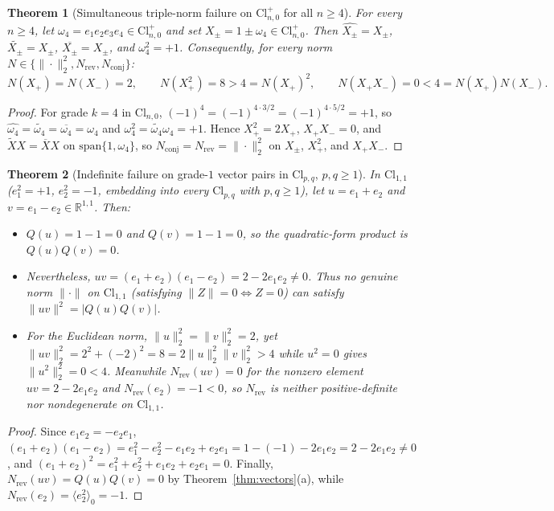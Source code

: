 \documentclass[11pt]{article}
\newtheorem{theorem}{Theorem}[section]
\theoremstyle{definition}
\newcommand{\Cl}{\mathrm{Cl}}
\newcommand{\R}{\mathbb{R}}
\newcommand{\Nrev}{N_{\mathrm{rev}}}
\newcommand{\Nconj}{N_{\mathrm{conj}}}
\begin{document}
\begin{theorem}[Simultaneous triple-norm failure on $\Cl_{n,0}^+$ for all $n\ge 4$]\label{thm:ref-even4}
For every $n\ge 4$, let $\omega_4=e_1e_2e_3e_4\in\Cl_{n,0}^+$ and set $X_\pm=1\pm\omega_4\in\Cl_{n,0}^+$. Then $\widehat{X_\pm}=X_\pm$, $\widetilde{X_\pm}=X_\pm$, $\overline{X_\pm}=X_\pm$, and $\omega_4^2=+1$. Consequently, for every norm $N\in\{\|\cdot\|_2^2,\Nrev,\Nconj\}$:
\[
  N(X_+)=N(X_-)=2, \qquad N(X_+^2)=8 > 4 = N(X_+)^2, \qquad N(X_+X_-)=0 < 4 = N(X_+)N(X_-).
\]
\end{theorem}
\begin{proof}
For grade $k=4$ in $\Cl_{n,0}$, $(-1)^4=(-1)^{4\cdot 3/2}=(-1)^{4\cdot 5/2}=+1$, so $\widehat{\omega_4}=\widetilde{\omega_4}=\overline{\omega_4}=\omega_4$ and $\omega_4^2=\widetilde{\omega_4}\omega_4=+1$. Hence $X_+^2=2X_+$, $X_+X_-=0$, and $\widetilde{X}X=\overline{X}X$ on $\mathrm{span}\{1,\omega_4\}$, so $\Nconj=\Nrev=\|\cdot\|_2^2$ on $X_\pm$, $X_+^2$, and $X_+X_-$.
\end{proof}

\begin{theorem}[Indefinite failure on grade-$1$ vector pairs in $\Cl_{p,q}$, $p,q\ge 1$]\label{thm:ref-indef}
In $\Cl_{1,1}$ ($e_1^2=+1$, $e_2^2=-1$, embedding into every $\Cl_{p,q}$ with $p,q\ge 1$), let $u=e_1+e_2$ and $v=e_1-e_2\in\R^{1,1}$. Then:
\begin{itemize}
  \item[(a)] $Q(u)=1-1=0$ and $Q(v)=1-1=0$, so the quadratic-form product is $Q(u)Q(v)=0$.
  \item[(b)] Nevertheless, $uv=(e_1+e_2)(e_1-e_2)=2-2e_1e_2\ne 0$. Thus no genuine norm $\|\cdot\|$ on $\Cl_{1,1}$ (satisfying $\|Z\|=0\iff Z=0$) can satisfy $\|uv\|^2=|Q(u)Q(v)|$.
  \item[(c)] For the Euclidean norm, $\|u\|_2^2=\|v\|_2^2=2$, yet $\|uv\|_2^2=2^2+(-2)^2=8=2\|u\|_2^2\|v\|_2^2>4$ while $u^2=0$ gives $\|u^2\|_2^2=0<4$. Meanwhile $\Nrev(uv)=0$ for the nonzero element $uv=2-2e_1e_2$ and $\Nrev(e_2)=-1<0$, so $\Nrev$ is neither positive-definite nor nondegenerate on $\Cl_{1,1}$.
\end{itemize}
\end{theorem}
\begin{proof}
Since $e_1e_2=-e_2e_1$, $(e_1+e_2)(e_1-e_2)=e_1^2-e_2^2-e_1e_2+e_2e_1=1-(-1)-2e_1e_2=2-2e_1e_2\ne 0$, and $(e_1+e_2)^2=e_1^2+e_2^2+e_1e_2+e_2e_1=0$. Finally, $\Nrev(uv)=Q(u)Q(v)=0$ by Theorem~\ref{thm:vectors}(a), while $\Nrev(e_2)=\langle e_2^2\rangle_0=-1$.
\end{proof}
\end{document}
